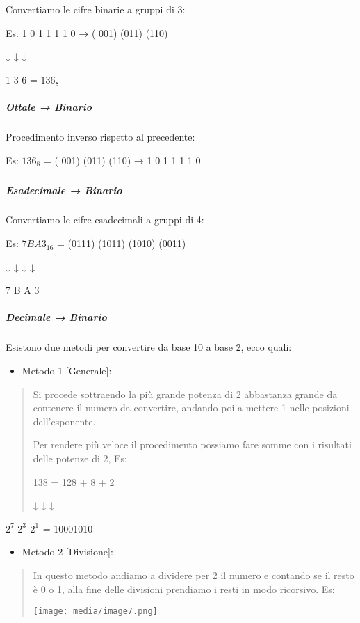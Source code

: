 Convertiamo le cifre binarie a gruppi di 3:

Es. 1 0 1 1 1 1 0 → ( 001) (011) (110)

↓ ↓ ↓

1 3 6 = \(136_{8}\)

\subparagraph{\texorpdfstring{\emph{Ottale → Binario}
}{Ottale → Binario }}\label{ottale-binario}

Procedimento inverso rispetto al precedente:

Es: \(136_{8}\) = ( 001) (011) (110) → 1 0 1 1 1 1 0

\subparagraph{}\label{section-3}

\subparagraph{\texorpdfstring{\emph{Esadecimale → Binario}
}{Esadecimale → Binario }}\label{esadecimale-binario}

Convertiamo le cifre esadecimali a gruppi di 4:

Es: \({7BA3}_{16}\) = (0111) (1011) (1010) (0011)

↓ ↓ ↓ ↓

7 B A 3

\subparagraph{\texorpdfstring{\emph{Decimale → Binario}
}{Decimale → Binario }}\label{decimale-binario}

Esistono due metodi per convertire da base 10 a base 2, ecco quali:

\begin{itemize}
\item
  Metodo 1 {[}Generale{]}:
\end{itemize}

\begin{quote}
Si procede sottraendo la più grande potenza di 2 abbastanza grande da
contenere il numero da convertire, andando poi a mettere 1 nelle
posizioni dell'esponente.

Per rendere più veloce il procedimento possiamo fare somme con i
risultati delle potenze di 2, Es:

138 = 128 + 8 + 2

↓ ↓ ↓
\end{quote}

\(2^{7}\) \({2^{3}}_{}\) \({2^{1}}_{}\) = 10001010

\begin{itemize}
\item
  Metodo 2 {[}Divisione{]}:
\end{itemize}

\begin{quote}
In questo metodo andiamo a dividere per 2 il numero e contando se il
resto è 0 o 1, alla fine delle divisioni prendiamo i resti in modo
ricorsivo. Es:

\texttt{[image: media/image7.png]}\(\)
\end{quote}

